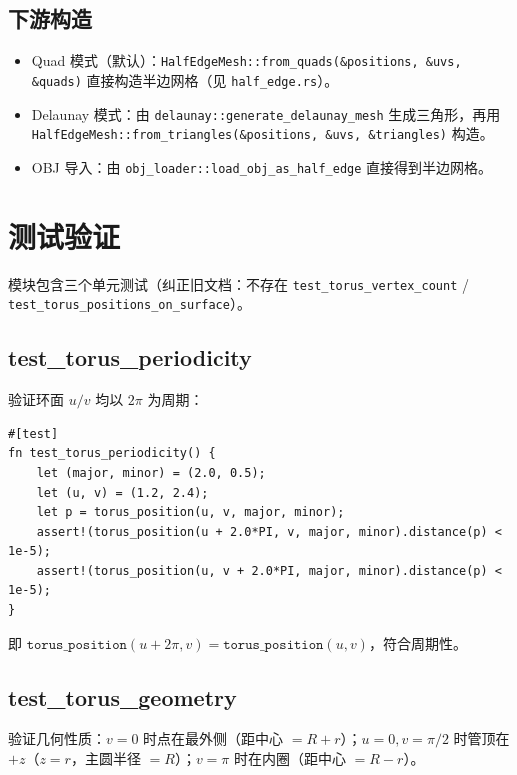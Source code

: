 \documentclass[12pt,a4paper]{article}
\begin{document}
\subsection{下游构造}

\begin{itemize}
\item Quad 模式（默认）：\texttt{HalfEdgeMesh::from\_quads(\&positions, \&uvs, \&quads)} 直接构造半边网格（见 \texttt{half\_edge.rs}）。
\item Delaunay 模式：由 \texttt{delaunay::generate\_delaunay\_mesh} 生成三角形，再用 \texttt{HalfEdgeMesh::from\_triangles(\&positions, \&uvs, \&triangles)} 构造。
\item OBJ 导入：由 \texttt{obj\_loader::load\_obj\_as\_half\_edge} 直接得到半边网格。
\end{itemize}

\section{测试验证}

模块包含三个单元测试（纠正旧文档：不存在 \texttt{test\_torus\_vertex\_count} / \texttt{test\_torus\_positions\_on\_surface}）。

\subsection{test\_torus\_periodicity}

验证环面 $u/v$ 均以 $2\pi$ 为周期：
\begin{lstlisting}[]
#[test]
fn test_torus_periodicity() {
    let (major, minor) = (2.0, 0.5);
    let (u, v) = (1.2, 2.4);
    let p = torus_position(u, v, major, minor);
    assert!(torus_position(u + 2.0*PI, v, major, minor).distance(p) < 1e-5);
    assert!(torus_position(u, v + 2.0*PI, major, minor).distance(p) < 1e-5);
}
\end{lstlisting}
即 $\texttt{torus\_position}(u+2\pi, v) = \texttt{torus\_position}(u, v)$，符合周期性。

\subsection{test\_torus\_geometry}

验证几何性质：$v=0$ 时点在最外侧（距中心 $=R+r$）；$u=0, v=\pi/2$ 时管顶在 $+z$（$z=r$，主圆半径 $=R$）；$v=\pi$ 时在内圈（距中心 $=R-r$）。
\end{document}
